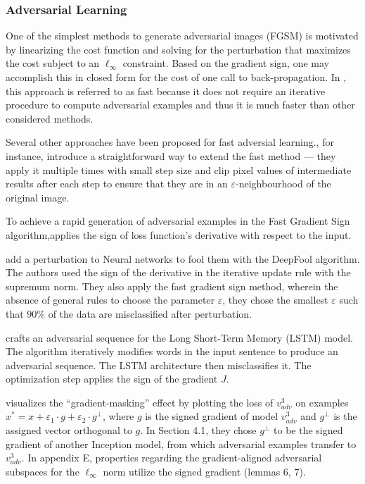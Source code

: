 \documentclass[11pt]{book}
\begin{document}
\subsubsection{Adversarial Learning}

One of the simplest methods to generate adversarial images (FGSM)
is motivated by linearizing the cost function and solving for the
perturbation that maximizes the cost subject to an $\ell_{\infty}$
constraint. Based on the gradient sign, one may accomplish this in
closed form for the cost of one call to back-propagation. In \cite{kurakin2016adversarial},
this approach is referred to as \textquotedbl fast\textquotedbl{} because
it does not require an iterative procedure to compute adversarial
examples and thus it is much faster than other considered methods.

Several other approaches have been proposed for fast adversial learning.\cite{kurakin2016adversarial},
for instance, introduce a straightforward way to extend the \textquotedbl fast\textquotedbl{}
method --- they apply it multiple times with small step size and
clip pixel values of intermediate results after each step to ensure
that they are in an $\varepsilon$-neighbourhood of the original image.

To achieve a rapid generation of adversarial examples in the \textquotedbl Fast
Gradient Sign\textquotedbl{} algorithm,\cite{goodfellow2014explaining}applies
the sign of loss function's derivative with respect to the input.

\cite{moosavi2016deepfool} add a perturbation to Neural networks
to fool them with the DeepFool algorithm. The authors used the sign
of the derivative in the iterative update rule with the supremum norm.
They also apply the fast gradient sign method, wherein the absence
of general rules to choose the parameter $\varepsilon$, they chose
the smallest $\varepsilon$ such that $90\%$ of the data are misclassified
after perturbation.

\cite{papernot2016crafting}crafts an adversarial sequence for the
Long Short-Term Memory (LSTM) model. The algorithm iteratively modifies
words in the input sentence to produce an adversarial sequence. The
LSTM architecture then misclassifies it. The optimization step applies
the sign of the gradient $J$.

\cite{tramer2017ensemble} visualizes the ``gradient-masking'' effect
by plotting the loss of $v_{adv}^{3}$ on examples $x^{\ast}=x+\varepsilon_{1}\cdot g+\varepsilon_{2}\cdot g^{\bot}$,
where $g$ is the signed gradient of model $v_{adv}^{3}$ and $g^{\bot}$
is the assigned vector orthogonal to $g$. In Section 4.1, they chose
$g^{\bot}$ to be the signed gradient of another Inception model,
from which adversarial examples transfer to $v_{adv}^{3}$. In appendix
E, properties regarding the gradient-aligned adversarial subspaces
for the $\ell_{\infty}$ norm utilize the signed gradient (lemmas
6, 7).
\end{document}
